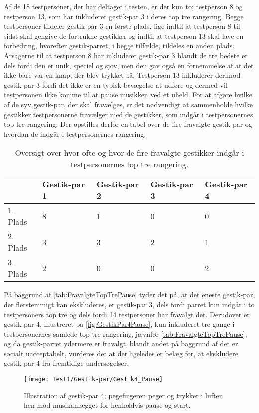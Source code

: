 Af de 18 testpersoner, der har deltaget i testen, er der kun to; testperson 8 og testperson 13, som har inkluderet gestik-par 3 i deres top tre rangering. Begge testpersoner tildeler gestik-par 3 en første plads, lige indtil at testperson 8 til sidst skal gengive de fortrukne gestikker og indtil at testperson 13 skal lave en forbedring, hvorefter gestik-parret, i begge tilfælde, tildeles en anden plads. Årsagerne til at testperson 8 har inkluderet gestik-par 3 blandt de tre bedste er dels fordi den er unik, speciel og sjov, men den gav også en fornemmelse af at det ikke bare var en knap, der blev trykket på. Testperson 13 inkluderer derimod gestik-par 3 fordi det ikke er en typisk bevægelse at udføre og dermed vil testpersonen ikke komme til at pause musikken ved et uheld.\blankline
%
For at afgøre hvilke af de syv gestik-par, der skal fravælges, er det nødvendigt at sammenholde hvilke gestikker testpersonerne fravælger med de gestikker, som indgår i testpersonernes top tre rangering. Der opstilles derfor en tabel over de fire fravalgte gestik-par og hvordan de indgår i testpersonernes rangering.
%
\begin{table}[H]
	\centering
	\begin{tabular}{ | p{2.4cm} | p{2.4cm} | p{2.4cm} | p{2.4cm} | p{2.4cm} |}
	\hline
		 & Gestik-par 1 & Gestik-par 2 & Gestik-par 3 & Gestik-par 4 \\ \hline
		1. Plads & 8 & 1 & 0 & 0\\ \hline
		2. Plads & 3 & 3 & 2 & 1\\ \hline
		3. Plads & 2 & 0 & 0 & 2\\ \hline
	\end{tabular}
	\caption{Oversigt over hvor ofte og hvor de fire fravalgte gestikker indgår i testpersonernes top tre rangering.}
	\label{tab:FravalgteTopTrePause}
\end{table}
\noindent
%
På baggrund af \autoref{tab:FravalgteTopTrePause} tyder det på, at det eneste gestik-par, der flerstemmigt kan ekskluderes, er gestik-par 3, dels fordi parret kun indgår i to testpersoners top tre og dels fordi 14 testpersoner har fravalgt det. Derudover er gestik-par 4, illustreret på \autoref{fig:GestikPar4Pause}, kun inkluderet tre gange i testpersonernes samlede top tre rangering, jævnfør \autoref{tab:FravalgteTopTrePause}, og da gestik-parret ydermere er fravalgt, blandt andet på baggrund af det er socialt uacceptabelt, vurderes det at der ligeledes er belæg for, at ekskludere gestik-par 4 fra fremtidige undersøgelser.  
%
\begin{figure}[H]
	\centering
	\texttt{[image: Test1/Gestik-par/Gestik4\_Pause]}
	\caption{Illustration af gestik-par 4; pegefingeren peger og trykker i luften hen mod musikanlægget for henholdvis pause og start.}
	\label{fig:GestikPar4Pause}
\end{figure}
